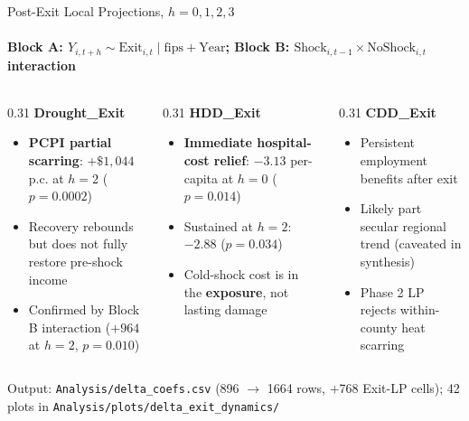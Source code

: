 \documentclass[aspectratio=169,11pt]{beamer}
\newcommand{\emphcolor}[1]{{\color{WarmOrange}\textbf{#1}}}
\newcommand{\tealtext}[1]{{\color{Teal}#1}}
\newcommand{\graytext}[1]{{\color{WarmGray}#1}}
\begin{document}
\begin{frame}{Post-Exit Local Projections, \(h = 0, 1, 2, 3\)}
  \framesubtitle{Block A: \(Y_{i,t+h} \sim \text{Exit}_{i,t} \mid \text{fips}+\text{Year}\); Block B: \(\text{Shock}_{i,t-1} \times \text{NoShock}_{i,t}\) interaction}
  \begin{columns}[T]
    \begin{column}{0.31\textwidth}
      \textbf{\tealtext{Drought\_Exit}}
      \begin{itemize}\itemsep0.12em
        \item \emphcolor{PCPI partial scarring}: \(+\$1{,}044\) p.c. at \(h=2\) (\(p=0.0002\))
        \item Recovery rebounds but does not fully restore pre-shock income
        \item Confirmed by Block B interaction (\(+964\) at \(h=2\), \(p=0.010\))
      \end{itemize}
    \end{column}
    \begin{column}{0.31\textwidth}
      \textbf{\tealtext{HDD\_Exit}}
      \begin{itemize}\itemsep0.12em
        \item \emphcolor{Immediate hospital-cost relief}: \(-3.13\) per-capita at \(h=0\) (\(p=0.014\))
        \item Sustained at \(h=2\): \(-2.88\) (\(p=0.034\))
        \item Cold-shock cost is in the \emphcolor{exposure}, not lasting damage
      \end{itemize}
    \end{column}
    \begin{column}{0.31\textwidth}
      \textbf{\tealtext{CDD\_Exit}}
      \begin{itemize}\itemsep0.12em
        \item Persistent employment benefits after exit
        \item Likely part secular regional trend (caveated in synthesis)
        \item Phase 2 LP rejects within-county heat scarring
      \end{itemize}
    \end{column}
  \end{columns}
  \vspace{0.6em}
  \begin{center}
    \footnotesize\graytext{Output: \texttt{Analysis/delta\_coefs.csv} (896 \(\to\) 1664 rows, \(+\)768 Exit-LP cells); 42 plots in \texttt{Analysis/plots/delta\_exit\_dynamics/}}
  \end{center}
\end{frame}
\end{document}
